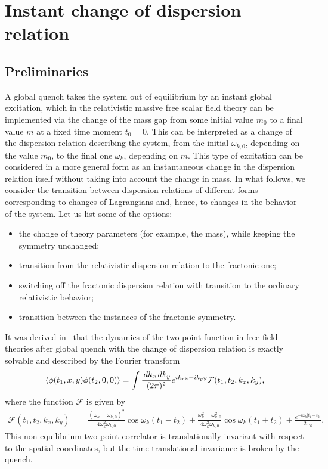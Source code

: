 \documentclass[a4paper,12pt]{article}
\newcommand{\be}{\begin{equation}}
\newcommand{\ee}{\end{equation}}
\DeclarePairedDelimiter\corrfunc{\langle}{\rangle}
\newcommand{\om}{\omega}
\begin{document}
\section{Instant change of dispersion relation}
\label{sec:mass-quench}

\subsection*{Preliminaries}

A global quench takes the system out of equilibrium by an instant global excitation, which in the relativistic massive free scalar field theory can be implemented via the change of the mass gap from some initial value $m_0$ to a final value $m$ at a fixed time moment $t_0 = 0$. This can be interpreted as a change of the dispersion relation describing the system, from the initial $\om_{k,0}$, depending on the value $m_0$, to the final one $\om_k$, depending on $m$. This type of excitation can be considered in a more general form as an instantaneous change in the dispersion relation itself without taking into account the change in mass. In what follows, we consider the transition between dispersion relations of different forms corresponding to changes of Lagrangians and, hence, to changes in the behavior of the system. Let us list some of the options:
\begin{itemize}
    \item the change of theory parameters (for example, the mass), while keeping the symmetry unchanged;
    \item transition from the relativistic dispersion relation to the fractonic one;
    \item switching off the fractonic dispersion relation with transition to the ordinary relativistic behavior;
    \item transition between the instances of the fractonic symmetry.
\end{itemize}

It was derived in~\cite{Calabrese:2007rg, Sotiriadis:2010si} that the dynamics of the two-point function in free field theories after global quench with the change of dispersion relation is exactly solvable and described by the Fourier transform
\be
    \corrfunc{\phi(t_1, x, y)\phi(t_2, 0, 0)} = \int\frac{\,dk_x\,dk_y}{(2\pi)^2}e^{ik_xx + ik_yy} \mathcal{F}(t_1, t_2, k_x, k_y),
\ee
where the function $\mathcal{F}$ is given by
\be
    \begin{aligned}
        \mathcal{F}(t_1, t_2, k_x, k_y) & = \frac{(\om_k - \om_{k,0})^2}{4\om_k^2\om_{k,0}}\cos\om_k(t_1 - t_2) + \frac{\om_k^2 - \om_{k,0}^2}{4\om_k^2\om_{k,0}}\cos\om_k(t_1 + t_2) + \frac{e^{-i\om_k|t_1 - t_2|}}{2\om_k}.
    \end{aligned}
\ee
This non-equilibrium two-point correlator is translationally invariant with respect to the spatial coordinates, but the time-translational invariance is broken by the quench.
\end{document}
